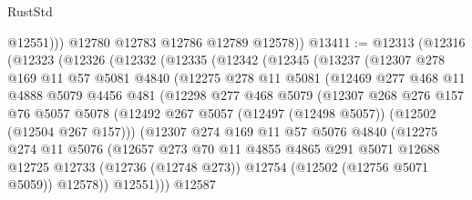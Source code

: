 \begin{lexlean}{RustStd}
\begin{coremodule}
              @12551)))
        @12780
        @12783
        @12786
        @12789
        @12578))
@13411 := @12313
    (@12316
      (@12323
        (@12326
          (@12332
            (@12335
              (@12342
                (@12345
                  (@13237
                    (@12307
                      @278
                      @169
                      @11
                      @57
                      @5081
                      @4840
                      (@12275
                        @278
                        @11
                        @5081
                        (@12469
                          @277
                          @468
                          @11
                          @4888
                          @5079
                          @4456
                          @481
                          (@12298
                            @277
                            @468
                            @5079
                            (@12307
                              @268
                              @276
                              @157
                              @76
                              @5057
                              @5078
                              (@12492
                                @267
                                @5057
                                (@12497 (@12498 @5057))
                                (@12502 (@12504 @267 @157)))
                              (@12307
                                @274
                                @169
                                @11
                                @57
                                @5076
                                @4840
                                (@12275
                                  @274
                                  @11
                                  @5076
                                  (@12657
                                    @273
                                    @70
                                    @11
                                    @4855
                                    @4865
                                    @291
                                    @5071
                                    @12688
                                    @12725
                                    @12733
                                    (@12736 (@12748 @273))
                                    @12754
                                    (@12502 (@12756 @5071 @5059))
                                    @12578))
                                @12551)))
                          @12587

\end{coremodule}
\end{lexlean}

